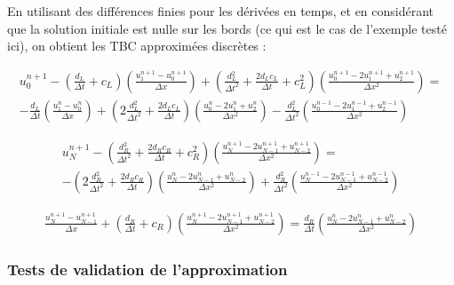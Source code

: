 \indent En utilisant des différences finies pour les dérivées en temps, et en considérant que la solution initiale est nulle sur les bords (ce qui est le cas de l'exemple testé ici), on obtient les TBC approximées discrètes : 

\begin{equation*}
\label{eq:appDiscTBCP1}
	\begin{aligned}
    u_0^{n+1} - \left( \frac{d_L}{\Delta t} + c_L \right) \left( \frac{u_1^{n+1} - u_0^{n+1}}{\Delta x}\right) +   \left( \frac{d_L^2}{\Delta t^2} + \frac{2d_Lc_L}{\Delta t} + c_L^2  \right) \left(  \frac{u_0^{n+1} - 2u_1^{n+1} + u_2^{n+1}}{\Delta x^2} \right)  = \\
        -\frac{d_L}{\Delta t}\left( \frac{u_1^{n} - u_0^{n}}{\Delta x}\right) +  \left( 2\frac{d_L^2}{\Delta t^2} + \frac{2d_Lc_L}{\Delta t}\right) \left(  \frac{u_0^{n} - 2u_1^n + u_2^{n}}{\Delta x^2} \right)    -  \frac{d_L^2}{\Delta t^2} \left(  \frac{u_0^{n-1} - 2u_1^{n-1} + u_2^{n-1}}{\Delta x^2} \right)
   \end{aligned}
\end{equation*} 

\begin{equation*}
	\begin{aligned}
    u_N^{n+1} - \left( \frac{d_R^2}{\Delta t^2} + \frac{2d_Rc_R}{\Delta t} + c_R^2  \right) \left(  \frac{u_{N}^{n+1} - 2u_{N-1}^{n+1} + u_{N-2}^{n+1}}{\Delta x^2} \right) = \\
     -\left( 2\frac{d_R^2}{\Delta t^2} + \frac{2d_Rc_R}{\Delta t}\right) \left(  \frac{u_N^{n} - 2u_{N-1}^n + u_{N-2}^{n}}{\Delta x^2} \right) + \frac{d_R^2}{\Delta t^2} \left(  \frac{u_N^{n-1} - 2u_{N-1}^{n-1} + u_{N-2}^{n-1}}{\Delta x^2} \right)
    \end{aligned}
\end{equation*} 
   
\begin{equation*}
	\begin{aligned}	
    \frac{u_N^{n+1} - u_{N-1}^{n+1}}{\Delta x} + \left( \frac{d_R}{\Delta t} + c_R \right) \left( \frac{u_N^{n+1} -2 u_{N-1}^{n+1} + u_{N-2}^{n+1}}{\Delta x^2}\right) =      \frac{d_R}{\Delta t}\left( \frac{u_{N}^{n} - 2u_{N-1}^{n} + u_{N-2}^n}{\Delta x^2}\right)
    \end{aligned}
\end{equation*}

\subsubsection{Tests de validation de l'approximation}

